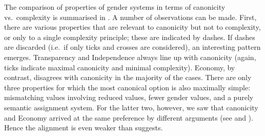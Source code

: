 \documentclass[output=collectionpaper]{langsci/langscibook}
\begin{document}
The comparison of properties of gender systems in terms of canonicity vs.\ complexity is summarised in . A number of observations can be made. First, there are various properties that are relevant to canonicity but not to complexity, or only to a single complexity principle; these are indicated by dashes. If dashes are discarded (i.e.\ if only ticks and crosses are considered), an interesting pattern emerges. Transparency and Independence always line up with canonicity (again, ticks indicate maximal canonicity and minimal complexity). Economy, by contrast, disagrees with canonicity in the majority of the cases. There are only three properties for which the most canonical option is also maximally simple: mismatching values involving reduced values, fewer gender values, and a purely semantic assignment system. For the latter two, however, we saw that canonicity and Economy arrived at the same preference by different arguments (see  and ). Hence the alignment is even weaker than  suggests.
\end{document}

